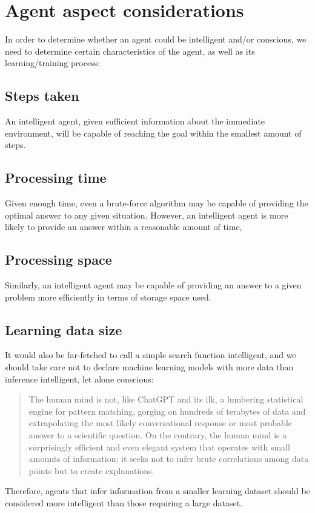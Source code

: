\documentclass[masterthesis]{fer}
\begin{document}
\section{Agent aspect considerations}
In order to determine whether an agent could be intelligent and/or conscious, we need to determine certain characteristics of the agent, as well as its learning/training process:
\subsection{Steps taken}
An intelligent agent, given sufficient information about the immediate environment, will be capable of reaching the goal within the smallest amount of steps.
\subsection{Processing time}
Given enough time, even a brute-force algorithm may be capable of providing the optimal answer to any given situation. However, an intelligent agent is more likely to provide an answer within a reasonable amount of time, 
\subsection{Processing space}
Similarly, an intelligent agent may be capable of providing an answer to a given problem more efficiently in terms of storage space used.
\subsection{Learning data size}
It would also be far-fetched to call a simple search function intelligent, and we should take care not to declare machine learning models with more data than inference intelligent, let alone conscious:
\begin{quote}
The human mind is not, like ChatGPT and its ilk, a lumbering statistical engine for pattern matching, gorging on hundreds of terabytes of data and extrapolating the most likely conversational response or most probable answer to a scientific question. On the contrary, the human mind is a surprisingly efficient and even elegant system that operates with small amounts of information; it seeks not to infer brute correlations among data points but to create explanations. 
\cite{Chomsky2023}
\end{quote}

Therefore, agents that infer information from a smaller learning dataset should be considered more intelligent than those requiring a large dataset.
\end{document}
